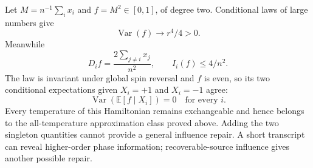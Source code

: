 Let \(M=n^{-1}\sum_i x_i\) and \(f=M^2\in[0,1]\), of degree two.
Conditional laws of large numbers give
\[
 \operatorname{Var}(f)\longrightarrow r^4/4>0.
\]
Meanwhile
\[
 D_i f=\frac{2\sum_{j\ne i}x_j}{n^2},\qquad I_i(f)\le4/n^2.
\]
The law is invariant under global spin reversal and \(f\) is even, so
its two conditional expectations given \(X_i=+1\) and \(X_i=-1\) agree:
\[
 \operatorname{Var}(\mathbb E[f\mid X_i])=0
 \quad\text{for every }i.
\]
Every temperature of this Hamiltonian remains exchangeable and hence
belongs to the all-temperature approximation class proved above.
Adding the two singleton quantities cannot provide a general influence
repair. A short transcript can reveal higher-order phase information;
recoverable-source influence gives another possible repair.
